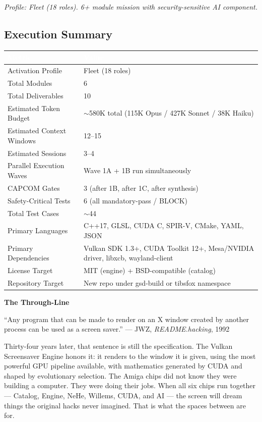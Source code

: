 \documentclass[11pt,letterpaper]{article}
\newcommand{\tableheader}[1]{\textbf{\sffamily\textcolor{white}{#1}}}
\begin{document}
\textit{Profile: Fleet (18 roles). 6+ module mission with security-sensitive AI component.}

\subsection{Execution Summary}

\begin{center}
\begin{tabularx}{\textwidth}{L{4cm}X}
\toprule
{}
\tableheader{Metric} & \tableheader{Value} \\
\midrule
Activation Profile & Fleet (18 roles) \\
Total Modules & 6 \\
Total Deliverables & 10 \\
Estimated Token Budget & $\sim$580K total (115K Opus / 427K Sonnet / 38K Haiku) \\
Estimated Context Windows & 12--15 \\
Estimated Sessions & 3--4 \\
Parallel Execution Waves & Wave 1A + 1B run simultaneously \\
CAPCOM Gates & 3 (after 1B, after 1C, after synthesis) \\
Safety-Critical Tests & 6 (all mandatory-pass / BLOCK) \\
Total Test Cases & $\sim$44 \\
Primary Languages & C++17, GLSL, CUDA C, SPIR-V, CMake, YAML, JSON \\
Primary Dependencies & Vulkan SDK 1.3+, CUDA Toolkit 12+, Mesa/NVIDIA driver, libxcb, wayland-client \\
License Target & MIT (engine) + BSD-compatible (catalog) \\
Repository Target & New repo under gsd-build or tibsfox namespace \\
\bottomrule
\end{tabularx}
\end{center}

\vspace{2em}
\begin{quotebox}
\textbf{\sffamily The Through-Line}

\vspace{0.5em}
``Any program that can be made to render on an X window created by another process can be used as a screen saver.''
--- JWZ, \textit{README.hacking}, 1992

\vspace{0.8em}
Thirty-four years later, that sentence is still the specification. The Vulkan Screensaver Engine honors it: it renders to the window it is given, using the most powerful GPU pipeline available, with mathematics generated by CUDA and shaped by evolutionary selection. The Amiga chips did not know they were building a computer. They were doing their jobs. When all six chips run together --- Catalog, Engine, NeHe, Willems, CUDA, and AI --- the screen will dream things the original hacks never imagined. That is what the spaces between are for.
\end{quotebox}
\end{document}
